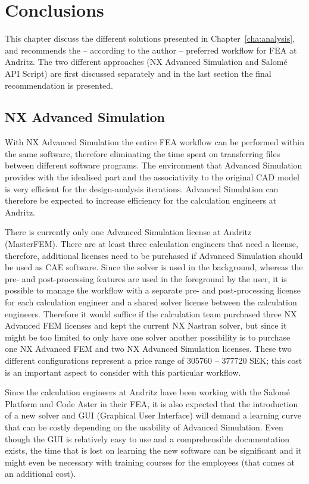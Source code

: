 
\chapter{Conclusions} %
\label{sec:conclusions}
This chapter discuss the different solutions presented in Chapter~\ref{cha:analysis}, and recommends the -- according to the author -- preferred workflow for FEA at Andritz. The two different approaches (NX Advanced Simulation and Salomé API Script) are first discussed separately and in the last section the final recommendation is presented.

\section{NX Advanced Simulation} %
\label{sec:nx_advanced_simulation}
With NX Advanced Simulation the entire FEA workflow can be performed within the same software, therefore eliminating the time spent on transferring files between different software programs. The environment that Advanced Simulation provides with the idealised part and the associativity to the original CAD model is very efficient for the design-analysis iterations. Advanced Simulation can therefore be expected to increase efficiency for the calculation engineers at Andritz.

There is currently only one Advanced Simulation license at Andritz (MasterFEM). There are at least three calculation engineers that need a license, therefore, additional licenses need to be purchased if Advanced Simulation should be used as CAE software. Since the solver is used in the background, whereas the pre- and post-processing features are used in the foreground by the user, it is possible to manage the workflow with a separate pre- and post-processing license for each calculation engineer and a shared solver license between the calculation engineers. Therefore it would suffice if the calculation team purchased three NX Advanced FEM licenses and kept the current NX Nastran solver, but since it might be too limited to only have one solver another possibility is to purchase one NX Advanced FEM and two NX Advanced Simulation licenses. These two different configurations represent a price range of \num{305760} -- \num{377720} SEK; this cost is an important aspect to consider with this particular workflow.

Since the calculation engineers at Andritz have been working with the Salomé Platform and Code Aster in their FEA, it is also expected that the introduction of a new solver and GUI (Graphical User Interface) will demand a learning curve that can be costly depending on the usability of Advanced Simulation. Even though the GUI is relatively easy to use and a comprehensible documentation exists, the time that is lost on learning the new software can be significant and it might even be necessary with training courses for the employees (that comes at an additional cost).


